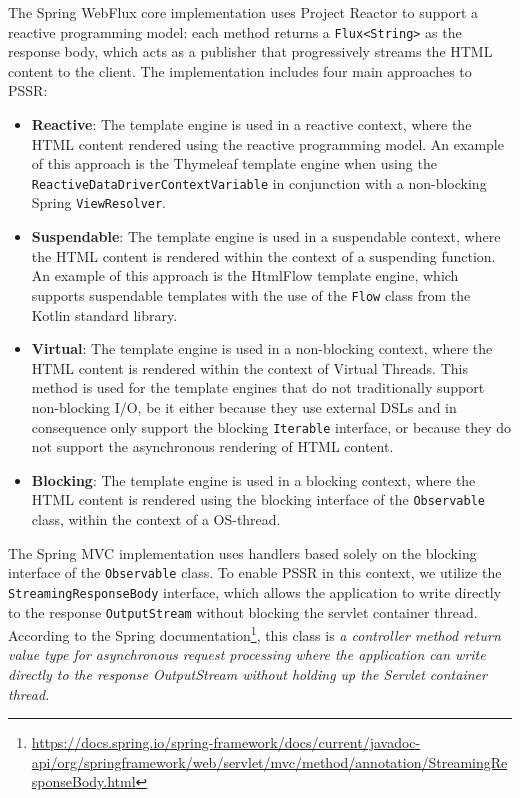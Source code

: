 The Spring WebFlux core implementation uses Project Reactor to support a
reactive programming model: each method returns a \texttt{Flux<String>} as the
response body, which acts as a publisher that progressively streams the HTML
content to the client. The implementation includes four main approaches to
PSSR\@:
\begin{itemize}
      \item \textbf{Reactive}: The template engine is used in a reactive context,
            where the HTML content rendered using the reactive programming model.
            An example of this approach is the Thymeleaf template engine
            when using the \texttt{ReactiveDataDriverContextVariable} in conjunction with a
            non-blocking Spring \texttt{ViewResolver}.
      \item \textbf{Suspendable}: The template engine is used in a suspendable
            context, where the HTML content is rendered within the context of a suspending function.
            An example of this approach is the HtmlFlow template engine, which
            supports suspendable templates with the use of the \texttt{Flow} class from the
            Kotlin standard library.
      \item \textbf{Virtual}: The template engine is used in a non-blocking
            context, where the HTML content is rendered within the context of Virtual
            Threads. This method is used for the template engines that do not traditionally
            support non-blocking I/O, be it either because they use external DSLs and in
            consequence only support the blocking \texttt{Iterable} interface, or
            because they do not support the asynchronous rendering of HTML content.
      \item \textbf{Blocking}: The template engine is used in a blocking
            context, where the HTML content is rendered using the blocking interface of the
            \texttt{Observable} class, within the context of a OS-thread.
\end{itemize}
The Spring MVC implementation uses handlers based solely on the blocking
interface of the \texttt{Observable} class. To enable PSSR in this context, we
utilize the \texttt{StreamingResponseBody} interface, which allows the
application to write directly to the response \texttt{OutputStream} without
blocking the servlet container thread. According to the Spring documentation\footnote{\url{https://docs.spring.io/spring-framework/docs/current/javadoc-api/org/springframework/web/servlet/mvc/method/annotation/StreamingResponseBody.html}},
this class is \textit{a controller method return value type for asynchronous
request processing where the application can write directly to the response
OutputStream without holding up the Servlet container thread.}

